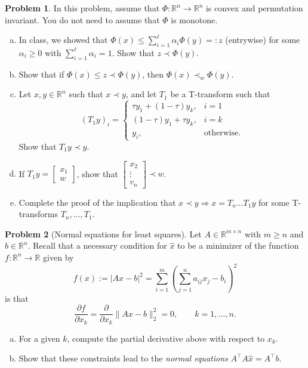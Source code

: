 \documentclass{amsart}[11pt]
\theoremstyle{definition}
\newtheorem{problem}{Problem}
\newcommand{\R}{\mathbb{R}}
\begin{document}
\begin{problem}
In this problem, assume that $\Phi:\R^n\to\R^n$ is convex and permutation invariant. You do not need to assume that $\Phi$ is monotone.
\begin{enumerate}[(a)]
\item In class, we showed that $\Phi(x) \leq \sum_{i=1}^\ell \alpha_i\Phi(y) =:z$ (entrywise) for some $\alpha_i\geq0$ with $\sum_{i=1}^\ell\alpha_i=1$. Show that $z\prec \Phi(y)$.
\item Show that if $\Phi(x) \leq z \prec \Phi(y)$, then $\Phi(x) \prec_w \Phi(y)$.
\item Let $x,y\in\R^n$ such that $x\prec y$, and let $T_1$ be a T-transform such that \[(T_1 y)_i = \begin{cases} \tau y_1+(1-\tau)y_k, & i=1\\ (1-\tau)y_1+\tau y_k, & i=k \\ y_i, & \text{otherwise}.\end{cases}\] Show that $T_1 y\prec y$.
\item If $T_1 y = \begin{bmatrix} x_1 \\ w\end{bmatrix}$, show that $\begin{bmatrix}x_2\\\vdots \\v_n\end{bmatrix} \prec w$.
\item Complete the proof of the implication that $x\prec y \Rightarrow x = T_n\dots T_1 y$ for some T-transforms $T_n,\dots,T_1$.
\end{enumerate}
\end{problem}

\begin{problem}[Normal equations for least squares]
Let $A\in\R^{m\times n}$ with $m\geq n$ and $b\in\R^n$.  Recall that a necessary condition for $\widehat{x}$ to be a minimizer of the function $f:\R^n\to\R$ given by
\[f(x):=|Ax-b|^2 = \sum_{i=1}^m \left(\sum_{j=1}^n a_{ij}x_j-b_i \right)^2 \]
is that 
\[ \frac{\partial f}{\partial x_k} = \frac{\partial}{\partial x_k} \|Ax-b\|_2^2 = 0,\qquad k=1,\dots,n. \]
\begin{enumerate}[(a)]
    \item For a given $k$, compute the partial derivative above with respect to $x_k$.
    \item Show that these constraints lead to the \textit{normal equations} $A^{\top}A\widehat{x}=A^{\top}b.$
\end{enumerate}
\end{problem}
\end{document}
